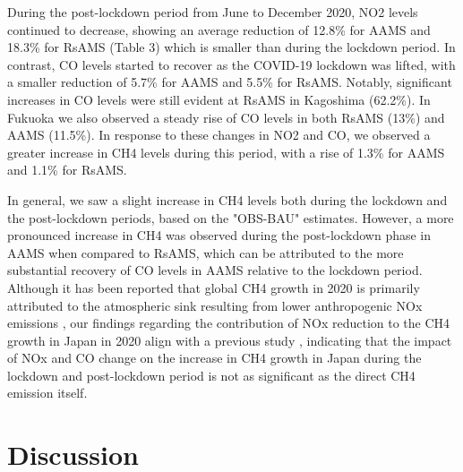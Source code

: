 During the post-lockdown period from June to December 2020, NO2 levels continued to decrease, showing an average reduction of 12.8\% for AAMS and 18.3\% for RsAMS (Table 3) which is smaller than during the lockdown period. In contrast, CO levels started to recover as the COVID-19 lockdown was lifted, with a smaller reduction of 5.7\% for AAMS and 5.5\% for RsAMS. Notably, significant increases in CO levels were still evident at RsAMS in Kagoshima (62.2\%). In Fukuoka we also observed a steady rise of CO levels in both RsAMS (13\%) and AAMS (11.5\%). In response to these changes in NO2 and CO, we observed a greater increase in CH4 levels during this period, with a rise of 1.3\% for AAMS and 1.1\% for RsAMS.\par
In general, we saw a slight increase in CH4 levels both during the lockdown and the post-lockdown periods, based on the "OBS-BAU" estimates. However, a more pronounced increase in CH4 was observed during the post-lockdown phase in AAMS when compared to RsAMS, which can be attributed to the more substantial recovery of CO levels in AAMS relative to the lockdown period. Although it has been reported that global CH4 growth in 2020 is primarily attributed to the atmospheric sink resulting from lower anthropogenic NOx emissions \citep{stevenson2022covid,peng2022wetland}, our findings regarding the contribution of NOx reduction to the CH4 growth in Japan in 2020 align with a previous study \citep{akimoto2022rethinking,qu2022attribution,feng2023methane}, indicating that the impact of NOx and CO change on the increase in CH4 growth in Japan during the lockdown and post-lockdown period is not as significant as the direct CH4 emission itself. \par

\section{Discussion} \label{chap4_disscussion}
